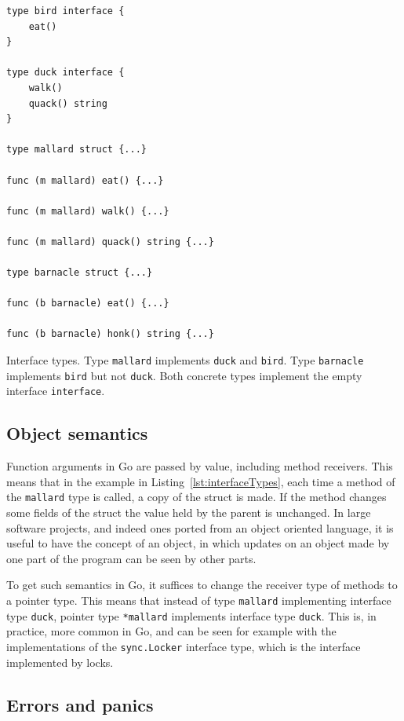 \documentclass[12pt,a4paper,oneside,openright]{report}
\newcommand{\mycaption}[2]{\caption[#1]{#1 #2}}
\newcommand{\goType}[1]{\texttt{#1}}
\begin{document}
\begin{Listing}[hbtp]
\begin{lstlisting}
type bird interface {
    eat()
}

type duck interface {
    walk()
    quack() string
}

type mallard struct {...}

func (m mallard) eat() {...}

func (m mallard) walk() {...}

func (m mallard) quack() string {...}

type barnacle struct {...}

func (b barnacle) eat() {...}

func (b barnacle) honk() string {...}
\end{lstlisting}

  \mycaption{Interface types.}{Type \goType{mallard} implements
    \goType{duck} and \goType{bird}. Type \goType{barnacle} implements
    \goType{bird} but not \goType{duck}. Both concrete types implement
    the empty interface \goType{interface\string{\string}}.}
  \label{lst:interfaceTypes}
\end{Listing}


\subsection{Object semantics}
\label{sec:prep:oop}

Function arguments in Go are passed by value, including method
receivers. This means that in the example in
Listing~\ref{lst:interfaceTypes}, each time a method of the
\goType{mallard} type is called, a copy of the struct is made. If the
method changes some fields of the struct the value held by the parent
is unchanged. In large software projects, and indeed ones ported from
an object oriented language, it is useful to have the concept of an
object, in which updates on an object made by one part of the program
can be seen by other parts.

To get such semantics in Go, it suffices to change the receiver type
of methods to a pointer type. This means that instead of type
\goType{mallard} implementing interface type \goType{duck}, pointer
type \goType{*mallard} implements interface type \goType{duck}. This
is, in practice, more common in Go, and can be seen for example with
the implementations of the \goType{sync.Locker} interface type, which
is the interface implemented by locks.

\subsection{Errors and panics}
\label{sec:prep:panics-errors}
\end{document}
